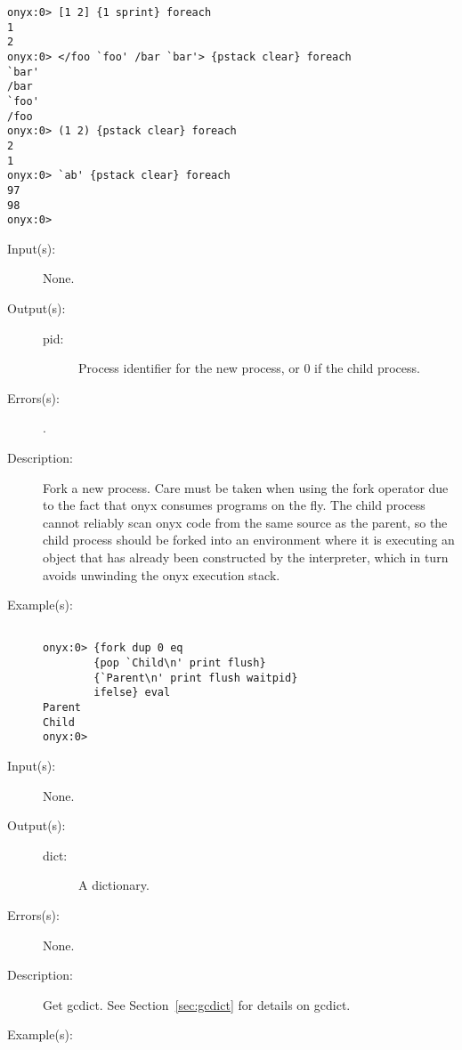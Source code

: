 \begin{description}
\begin{description}
\begin{verbatim}
onyx:0> [1 2] {1 sprint} foreach
1
2
onyx:0> </foo `foo' /bar `bar'> {pstack clear} foreach
`bar'
/bar
`foo'
/foo
onyx:0> (1 2) {pstack clear} foreach
2
1
onyx:0> `ab' {pstack clear} foreach
97
98
onyx:0>
		\end{verbatim}
	\end{description}
\label{systemdict:fork}
\item[{\onyxop{--}{fork}{pid}}: ]
	\begin{description}\item[]
	\item[Input(s): ] None.
	\item[Output(s): ]
		\begin{description}\item[]
		\item[pid: ]
			Process identifier for the new process, or 0 if the
			child process.
		\end{description}
	\item[Errors(s): ]
		\begin{description}\item[]
		\item[.]
		\end{description}
	\item[Description: ]
		Fork a new process.  Care must be taken when using the fork
		operator due to the fact that onyx consumes programs on the
		fly.  The child process cannot reliably scan onyx code from the
		same source as the parent, so the child process should be forked
		into an environment where it is executing an object that has
		already been constructed by the interpreter, which in turn
		avoids unwinding the onyx execution stack.
	\item[Example(s): ]\begin{verbatim}

onyx:0> {fork dup 0 eq
        {pop `Child\n' print flush}
        {`Parent\n' print flush waitpid}
        ifelse} eval
Parent
Child
onyx:0>
		\end{verbatim}
	\end{description}
\label{systemdict:gcdict}
\item[{\onyxop{--}{gcdict}{dict}}: ]
	\begin{description}\item[]
	\item[Input(s): ] None.
	\item[Output(s): ]
		\begin{description}\item[]
		\item[dict: ]
			A dictionary.
		\end{description}
	\item[Errors(s): ] None.
	\item[Description: ]
		Get gcdict.  See Section~\ref{sec:gcdict} for details on
		gcdict.
	\item[Example(s): ]\begin{verbatim}


\end{verbatim}
\end{description}
\end{description}
